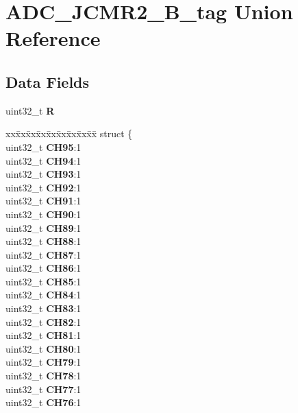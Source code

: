 \hypertarget{unionADC__JCMR2__32B__tag}{}\section{A\+D\+C\+\_\+\+J\+C\+M\+R2\+\_\+B\+\_\+tag Union Reference}
\label{unionADC__JCMR2__32B__tag}
\subsection*{Data Fields}
\begin{DoxyCompactItemize}
\item 
\mbox{\label{unionADC__JCMR2__32B__tag_a95cf9a29afb0466e029cb49a3938d06a}} 
uint32\+\_\+t {\bfseries R}
\item 
\mbox{\label{unionADC__JCMR2__32B__tag_a3f8ad519ab9c083abf2959d59e4ef054}} 
\begin{tabbing}
xx\=xx\=xx\=xx\=xx\=xx\=xx\=xx\=xx\=\kill
struct \{\\
\>uint32\_t {\bfseries CH95}:1\\
\>uint32\_t {\bfseries CH94}:1\\
\>uint32\_t {\bfseries CH93}:1\\
\>uint32\_t {\bfseries CH92}:1\\
\>uint32\_t {\bfseries CH91}:1\\
\>uint32\_t {\bfseries CH90}:1\\
\>uint32\_t {\bfseries CH89}:1\\
\>uint32\_t {\bfseries CH88}:1\\
\>uint32\_t {\bfseries CH87}:1\\
\>uint32\_t {\bfseries CH86}:1\\
\>uint32\_t {\bfseries CH85}:1\\
\>uint32\_t {\bfseries CH84}:1\\
\>uint32\_t {\bfseries CH83}:1\\
\>uint32\_t {\bfseries CH82}:1\\
\>uint32\_t {\bfseries CH81}:1\\
\>uint32\_t {\bfseries CH80}:1\\
\>uint32\_t {\bfseries CH79}:1\\
\>uint32\_t {\bfseries CH78}:1\\
\>uint32\_t {\bfseries CH77}:1\\
\>uint32\_t {\bfseries CH76}:1\\

\end{tabbing}
\end{DoxyCompactItemize}
